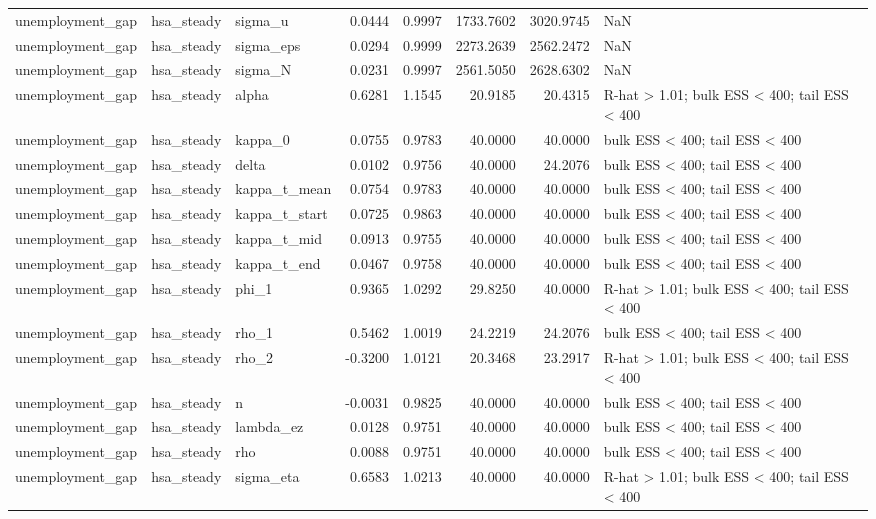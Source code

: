 \begin{tabular}{lllrrrrl}
unemployment\_gap & hsa\_steady & sigma\_u & 0.0444 & 0.9997 & 1733.7602 & 3020.9745 & NaN \\
unemployment\_gap & hsa\_steady & sigma\_eps & 0.0294 & 0.9999 & 2273.2639 & 2562.2472 & NaN \\
unemployment\_gap & hsa\_steady & sigma\_N & 0.0231 & 0.9997 & 2561.5050 & 2628.6302 & NaN \\
unemployment\_gap & hsa\_steady & alpha & 0.6281 & 1.1545 & 20.9185 & 20.4315 & R-hat > 1.01; bulk ESS < 400; tail ESS < 400 \\
unemployment\_gap & hsa\_steady & kappa\_0 & 0.0755 & 0.9783 & 40.0000 & 40.0000 & bulk ESS < 400; tail ESS < 400 \\
unemployment\_gap & hsa\_steady & delta & 0.0102 & 0.9756 & 40.0000 & 24.2076 & bulk ESS < 400; tail ESS < 400 \\
unemployment\_gap & hsa\_steady & kappa\_t\_mean & 0.0754 & 0.9783 & 40.0000 & 40.0000 & bulk ESS < 400; tail ESS < 400 \\
unemployment\_gap & hsa\_steady & kappa\_t\_start & 0.0725 & 0.9863 & 40.0000 & 40.0000 & bulk ESS < 400; tail ESS < 400 \\
unemployment\_gap & hsa\_steady & kappa\_t\_mid & 0.0913 & 0.9755 & 40.0000 & 40.0000 & bulk ESS < 400; tail ESS < 400 \\
unemployment\_gap & hsa\_steady & kappa\_t\_end & 0.0467 & 0.9758 & 40.0000 & 40.0000 & bulk ESS < 400; tail ESS < 400 \\
unemployment\_gap & hsa\_steady & phi\_1 & 0.9365 & 1.0292 & 29.8250 & 40.0000 & R-hat > 1.01; bulk ESS < 400; tail ESS < 400 \\
unemployment\_gap & hsa\_steady & rho\_1 & 0.5462 & 1.0019 & 24.2219 & 24.2076 & bulk ESS < 400; tail ESS < 400 \\
unemployment\_gap & hsa\_steady & rho\_2 & -0.3200 & 1.0121 & 20.3468 & 23.2917 & R-hat > 1.01; bulk ESS < 400; tail ESS < 400 \\
unemployment\_gap & hsa\_steady & n & -0.0031 & 0.9825 & 40.0000 & 40.0000 & bulk ESS < 400; tail ESS < 400 \\
unemployment\_gap & hsa\_steady & lambda\_ez & 0.0128 & 0.9751 & 40.0000 & 40.0000 & bulk ESS < 400; tail ESS < 400 \\
unemployment\_gap & hsa\_steady & rho & 0.0088 & 0.9751 & 40.0000 & 40.0000 & bulk ESS < 400; tail ESS < 400 \\
unemployment\_gap & hsa\_steady & sigma\_eta & 0.6583 & 1.0213 & 40.0000 & 40.0000 & R-hat > 1.01; bulk ESS < 400; tail ESS < 400 \\

\end{tabular}
